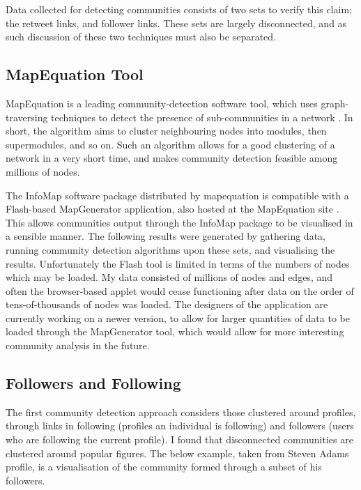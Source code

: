 Data collected for detecting communities consists of two sets to verify this claim; the retweet links, and follower links. These sets are largely disconnected, and as such discussion of these two techniques must also be separated.  

\subsection{MapEquation Tool}

MapEquation is a leading community-detection software tool, which uses graph-traversing techniques to detect the presence of sub-communities in a network \cite{mapequation}. In short, the algorithm aims to cluster neighbouring nodes into modules, then supermodules, and so on. Such an algorithm allows for a good clustering of a network in a very short time, and makes community detection feasible among millions of nodes.

The InfoMap software package distributed by mapequation is compatible with a Flash-based MapGenerator application, also hosted at the MapEquation site \cite{}. This allows communities output through the InfoMap package to be visualised in a sensible manner. The following results were generated by gathering data, running community detection algorithms upon these sets, and visualising the results. Unfortunately the Flash tool is limited in terms of the numbers of nodes which may be loaded. My data consisted of millions of nodes and edges, and often the browser-based applet would cease functioning after data on the order of tens-of-thousands of nodes was loaded. The designers of the application are currently working on a newer version, to allow for larger quantities of data to be loaded through the MapGenerator tool, which would allow for more interesting community analysis in the future. 

\subsection{Followers and Following}

The first community detection approach considers those clustered around profiles, through links in following (profiles an individual is following) and followers (users who are following the current profile). I found that disconnected communities are clustered around popular figures. The below example, taken from Steven Adams profile, is a visualisation of the community formed through a subset of his followers. 

